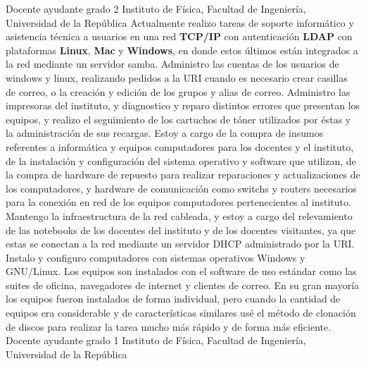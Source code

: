 \documentclass[11pt,a4paper]{moderncv}
\begin{document}
\cvline{}{}
        {Docente ayudante grado 2}{}
        {Instituto de Física, Facultad de Ingeniería, Universidad de la República}{}
        {Actualmente realizo tareas de soporte informático y asistencia técnica a usuarios en una red \textbf{TCP/IP} con autenticación \textbf{LDAP} con plataformas \textbf{Linux}, \textbf{Mac} y \textbf{Windows}, en donde estos últimos están integrados a la red mediante un servidor samba.
         \newline{}
         Administro las cuentas de los usuarios de windows y linux, realizando pedidos a la URI cuando es necesario crear casillas de correo, o la creación y edición de los grupos y alias de correo.
         \newline{}
         Administro las impresoras del instituto, y diagnostico y reparo distintos errores que presentan los equipos, y realizo el seguimiento de los cartuchos de tóner utilizados por éstas y la administración de sus recargas.
         \newline{}
         Estoy a cargo de la compra de insumos referentes a informática y equipos computadores para los docentes y el instituto, de la instalación y configuración del sistema operativo y software que utilizan, de la compra de hardware de repuesto para realizar reparaciones y actualizaciones de los computadores, y hardware de comunicación como switchs y routers necesarios para la conexión en red de los equipos computadores pertenecientes al instituto.
         \newline{}
         Mantengo la infraestructura de la red cableada, y estoy a cargo del relevamiento de las notebooks de los docentes del instituto y de los docentes visitantes, ya que estas se conectan a la red mediante un servidor DHCP administrado por la URI.
         \newline{}
         Instalo y configuro computadores con sistemas operativos Windows y GNU/Linux. Los equipos son instalados con el software de uso estándar como las suites de oficina, navegadores de internet y clientes de correo. En su gran mayoría los equipos fueron instalados de forma individual, pero cuando la cantidad de equipos era considerable y de características similares usé el método de clonación de discos para realizar la tarea mucho más rápido y de forma más eficiente.
         }
\cvline{}{}
        {Docente ayudante grado 1}{}
        {Instituto de Física, Facultad de Ingeniería, Universidad de la República}{}
\end{document}
